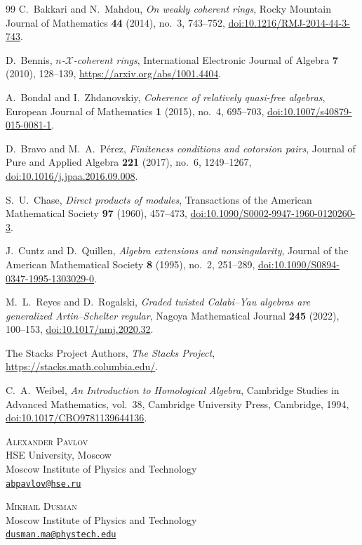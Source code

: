 \documentclass[11pt]{article}
\numberwithin{equation}{section}
\theoremstyle{definition}
\theoremstyle{remark}
\begin{document}
\begin{thebibliography}{99}
C.~Bakkari and N.~Mahdou,
\emph{On weakly coherent rings},
Rocky Mountain Journal of Mathematics \textbf{44} (2014), no.~3, 743--752,
\href{https://doi.org/10.1216/RMJ-2014-44-3-743}{doi:10.1216/RMJ-2014-44-3-743}.

D.~Bennis,
\emph{$n$-$\mathcal X$-coherent rings},
International Electronic Journal of Algebra \textbf{7} (2010), 128--139,
\url{https://arxiv.org/abs/1001.4404}.

A.~Bondal and I.~Zhdanovskiy,
\emph{Coherence of relatively quasi-free algebras},
European Journal of Mathematics \textbf{1} (2015), no.~4, 695--703,
\href{https://doi.org/10.1007/s40879-015-0081-1}{doi:10.1007/s40879-015-0081-1}.

D.~Bravo and M.~A.~P\'erez,
\emph{Finiteness conditions and cotorsion pairs},
Journal of Pure and Applied Algebra \textbf{221} (2017), no.~6,
1249--1267,
\href{https://doi.org/10.1016/j.jpaa.2016.09.008}{doi:10.1016/j.jpaa.2016.09.008}.

S.~U.~Chase,
\emph{Direct products of modules},
Transactions of the American Mathematical Society \textbf{97} (1960),
457--473,
\href{https://doi.org/10.1090/S0002-9947-1960-0120260-3}{doi:10.1090/S0002-9947-1960-0120260-3}.

J.~Cuntz and D.~Quillen,
\emph{Algebra extensions and nonsingularity},
Journal of the American Mathematical Society \textbf{8} (1995), no.~2,
251--289,
\href{https://doi.org/10.1090/S0894-0347-1995-1303029-0}{doi:10.1090/S0894-0347-1995-1303029-0}.

M.~L.~Reyes and D.~Rogalski,
\emph{Graded twisted Calabi--Yau algebras are generalized Artin--Schelter regular},
Nagoya Mathematical Journal \textbf{245} (2022), 100--153,
\href{https://doi.org/10.1017/nmj.2020.32}{doi:10.1017/nmj.2020.32}.

The Stacks Project Authors,
\emph{The Stacks Project},
\url{https://stacks.math.columbia.edu/}.

C.~A.~Weibel,
\emph{An Introduction to Homological Algebra},
Cambridge Studies in Advanced Mathematics, vol.~38,
Cambridge University Press, Cambridge, 1994,
\href{https://doi.org/10.1017/CBO9781139644136}{doi:10.1017/CBO9781139644136}.
\end{thebibliography}

\vspace{1.5em}
\noindent\textsc{Alexander Pavlov}\\
HSE University, Moscow\\
Moscow Institute of Physics and Technology\\
\href{mailto:abpavlov@hse.ru}{\nolinkurl{abpavlov@hse.ru}}

\medskip
\noindent\textsc{Mikhail Dusman}\\
Moscow Institute of Physics and Technology\\
\href{mailto:dusman.ma@phystech.edu}{\nolinkurl{dusman.ma@phystech.edu}}
\end{document}
